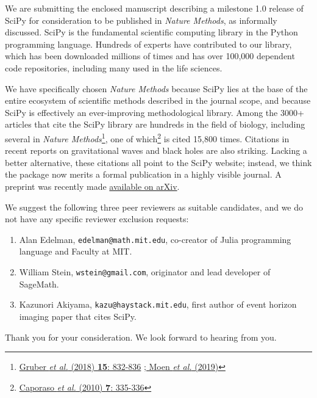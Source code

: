 \documentclass[10pt,stdletter,dateno]{newlfm}
\begin{document}
\begin{newlfm}

We are submitting the enclosed manuscript describing a milestone
1.0 release of SciPy for consideration to be published in
\emph{Nature Methods}, as informally discussed.
SciPy is the fundamental scientific 
computing library in the Python programming language. 
Hundreds of experts have contributed to our library, which
has been downloaded millions of times and has over 100,000 dependent
code repositories, including many used in the life sciences.

We have specifically chosen \emph{Nature Methods} because
SciPy lies at the base of the entire ecosystem of scientific methods
described in the journal scope, and because SciPy is effectively an
ever-improving methodological library. Among the 3000+ articles that 
cite the SciPy library are hundreds in the field of biology,
including several in \emph{Nature Methods}\footnote{\href{
https://www.nature.com/articles/s41592-018-0114-z}{
Gruber \emph{et al.} (2018) \textbf{15}: 832-836}
\href{https://www.nature.com/articles/s41592-019-0403-1}{
; Moen \emph{et al.} (2019)}}, one of which\footnote{
\href{https://www.nature.com/articles/nmeth.f.303}{
Caporaso \emph{et al.} (2010) \textbf{7}: 335-336}} is cited
15,800 times. Citations in recent reports on gravitational waves and
black holes are also striking. Lacking a better alternative, these citations all point
to the SciPy website; instead, we think the package now merits a
formal publication in a highly visible journal. A preprint was recently
made \href{https://arxiv.org/abs/1907.10121}{available on arXiv}.

We suggest the following three peer reviewers as suitable candidates,
and we do not have any specific reviewer exclusion requests:

\begin{enumerate}
    \item Alan Edelman, \texttt{edelman@math.mit.edu}, co-creator of Julia
    programming language and Faculty at MIT.
    \item William Stein, \texttt{wstein@gmail.com}, originator and
    lead developer of SageMath.
    \item Kazunori Akiyama, \texttt{kazu@haystack.mit.edu}, first author
    of event horizon imaging paper that cites SciPy.
\end{enumerate}

\vspace*{1cm}
Thank you for your consideration.  We look forward to
    hearing from you.
\end{newlfm}
\end{document}
